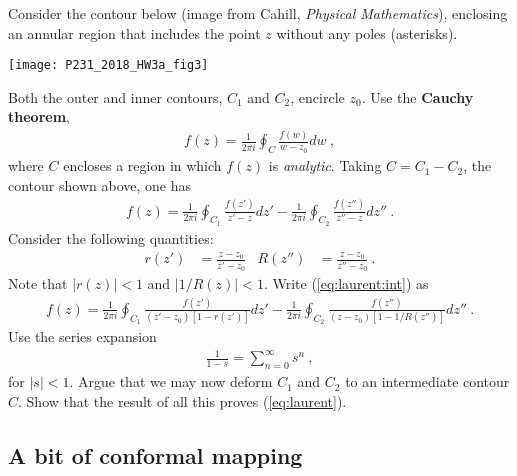 \documentclass[12pt]{article}
\numberwithin{equation}{subsection}    %
\begin{document}
Consider the contour below (image from Cahill, \emph{Physical Mathematics}), enclosing an annular region that includes the point $z$ without any poles (asterisks).
\begin{center}
\texttt{[image: P231\_2018\_HW3a\_fig3]}
\end{center}
Both the outer and inner contours, $C_1$ and $C_2$, encircle $z_0$. Use the \textbf{Cauchy theorem},
\begin{align}
	f(z) = \frac{1}{2\pi i} \oint_{C} \frac{f(w)}{w-z_0} dw \ ,
	\label{eq:laurent}
\end{align}
where $C$ encloses a region in which $f(z)$ is \emph{analytic}. Taking $C = C_1 - C_2$, the contour shown above, one has
\begin{align}
	f(z) = 
	\frac{1}{2\pi i} \oint_{C_1} \frac{f(z')}{z'-z} dz'
	-
	\frac{1}{2\pi i} \oint_{C_2} \frac{f(z'')}{z''-z} dz'' \ .
	\label{eq:laurent:int}
\end{align}
Consider the following quantities:
\begin{align}
	r(z') &= \frac{z-z_0}{z'-z_0}
	&
	R(z'') &= \frac{z - z_0}{z''-z_0} \ .
\end{align}
Note that $|r(z)| < 1$ and $|1/R(z)| < 1$. Write (\ref{eq:laurent:int}) as
\begin{align}
	f(z) = 
	\frac{1}{2\pi i} \oint_{C_1} \frac{f(z')}{(z'-z_0)\left[1-r(z')\right]} dz'
	-
	\frac{1}{2\pi i} \oint_{C_2} \frac{f(z'')}{(z-z_0)\left[1-1/R(z'')\right]} dz'' \ .
\end{align}
Use the series expansion
\begin{align}
	\frac{1}{1-s} = \sum_{n=0}^\infty s^n \ ,
\end{align}
for $|s|<1$. Argue that we may now deform $C_1$ and $C_2$ to an intermediate contour $C$. Show that the result of all this proves (\ref{eq:laurent}).


\subsection{A bit of conformal mapping}
\end{document}
